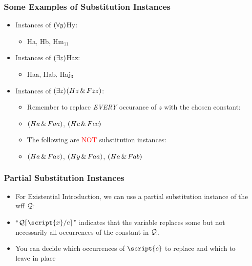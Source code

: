 \begin{frame}
\frametitle{Some Examples of Substitution Instances}

\begin{itemize}

\item Instances of $(\forall y)$Hy: 

\begin{itemize}

\item Ha, Hb, Hm$_{11}$  

\end{itemize}

\item Instances of $(\exists z)$Haz: 

\begin{itemize}

\item Haa, Hab, Haj$_3$  

\end{itemize}

\item Instances of $(\exists z)$$(Hz \,\&\, Fzz)$:

\begin{itemize}

\item Remember to replace \emph{EVERY} occurance of $z$ with the chosen constant:

\item $(Ha \,\&\, Faa)$, $(Hc \,\&\, Fcc)$

\item The following are \textcolor{red}{NOT} substitution instances:

\item $(Ha \,\&\, Faz)$, $(Hy \,\&\, Faa)$, $(Ha \,\&\, Fab)$

\end{itemize}

\end{itemize}
\end{frame}

\begin{frame}
\frametitle{Partial Substitution Instances}

\begin{itemize}

\item For Existential Introduction, we can use a partial substitution instance of the wff $\mathcal{Q}$:

\item ``$\metav{Q}\substitutesome{c}{\script{x}}$'' indicates that  the variable  replaces some but not necessarily all occurrences of the constant  in $\mathcal{Q}$. 

\item You can decide which occurrences of $\script{c}$ to replace and which to leave in place

\end{itemize}
\end{frame}

